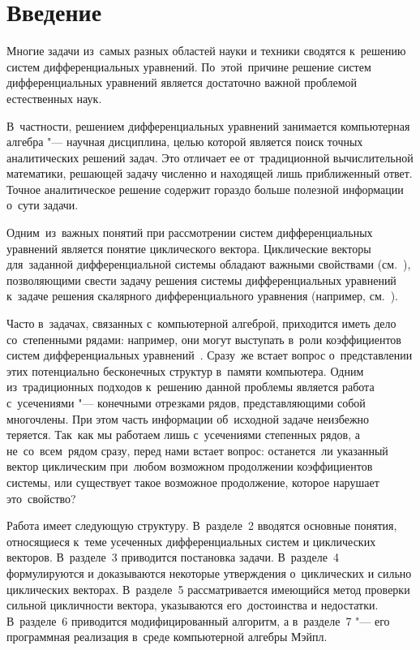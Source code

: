 \section{Введение}

Многие задачи из~самых разных областей науки и техники сводятся к~решению систем дифференциальных уравнений.
По~этой~причине решение систем дифференциальных уравнений является достаточно важной проблемой естественных наук.

В~частности, решением дифференциальных уравнений занимается компьютерная алгебра "--- научная дисциплина,
целью которой является поиск точных аналитических решений задач.
Это отличает ее от~традиционной вычислительной математики, решающей задачу численно и находящей лишь приближенный ответ.
Точное аналитическое решение содержит гораздо больше полезной информации о~сути задачи.
\medskip

Одним~из~важных понятий при рассмотрении систем дифференциальных уравнений является понятие циклического вектора.
Циклические векторы для~заданной дифференциальной системы обладают важными свойствами (см.~\cite{litKovacic}),
позволяющими свести задачу решения системы дифференциальных уравнений
к~задаче решения скалярного дифференциального уравнения (например, см.~\cite{litAbramovResolvingSequences}).

Часто в~задачах, связанных с~компьютерной алгеброй, приходится иметь дело со~степенными рядами:
например, они могут выступать в~роли коэффициентов систем дифференциальных уравнений~\cite{litAbramovPowerSeries}.
Сразу~же встает вопрос о~представлении этих потенциально бесконечных структур в~памяти компьютера.
Одним из~традиционных подходов к~решению данной проблемы является работа с~усечениями "--- конечными отрезками рядов, представляющими собой многочлены.
При этом часть информации об~исходной задаче неизбежно теряется.
Так~как мы работаем лишь с~усечениями степенных рядов, а не~со~всем~рядом сразу, перед нами встает вопрос:
останется~ли указанный вектор циклическим при~любом возможном продолжении коэффициентов системы,
или существует такое возможное продолжение, которое нарушает это~свойство?
\medskip

Работа имеет следующую структуру.
В~разделе~2 вводятся основные понятия, относящиеся к~теме усеченных дифференциальных систем и циклических векторов.
В~разделе~3 приводится постановка задачи.
В~разделе~4 формулируются и доказываются некоторые утверждения о~циклических и сильно циклических векторах.
В~разделе~5 рассматривается имеющийся метод проверки сильной цикличности вектора, указываются его~достоинства и недостатки.
В~разделе~6 приводится модифицированный алгоритм,
а в~разделе~7 "--- его программная реализация в~среде компьютерной алгебры Мэйпл.
